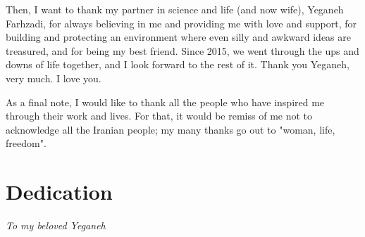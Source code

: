 Then, I want to thank my partner in science and life (and now wife), Yeganeh Farhzadi, for always believing in me and providing me with love and support, for building and protecting an environment where even silly and awkward ideas are treasured, and for being my best friend. Since 2015, we went through the ups and downs of life together, and I look forward to the rest of it. Thank you Yeganeh, very much. I love you.

As a final note, I would like to thank all the people who have inspired me through their work and lives. For that, it would be remiss of me not to acknowledge all the Iranian people; my many thanks go out to "woman, life, freedom".

\newpage

\section*{Dedication}

\textit{To my beloved Yeganeh}

\newpage
